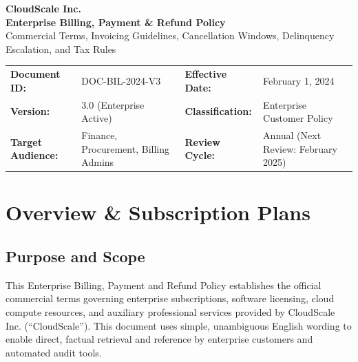 \documentclass[10pt,letterpaper]{article}
\begin{document}
\begin{center}
  {\LARGE\bfseries\color{primary} CloudScale Inc.}\\[1.5pt]
  {\Large\bfseries\color{secondary} Enterprise Billing, Payment \& Refund Policy}\\[1pt]
  {\small\color{darkgray} Commercial Terms, Invoicing Guidelines, Cancellation Windows, Delinquency Escalation, and Tax Rules}
\end{center}

\vspace{-4pt}

\begin{tcolorbox}
\footnotesize
\begin{tabularx}{\linewidth}{@{}l X l X@{}}
  \textbf{Document ID:} & DOC-BIL-2024-V3 & \textbf{Effective Date:} & February 1, 2024 \\
  \textbf{Version:} & 3.0 (Enterprise Active) & \textbf{Classification:} & Enterprise Customer Policy \\
  \textbf{Target Audience:} & Finance, Procurement, Billing Admins & \textbf{Review Cycle:} & Annual (Next Review: February 2025)
\end{tabularx}
\end{tcolorbox}

\vspace{-2pt}

\section{Overview \& Subscription Plans}

\subsection{Purpose and Scope}
This Enterprise Billing, Payment and Refund Policy establishes the official commercial terms governing enterprise subscriptions, software licensing, cloud compute resources, and auxiliary professional services provided by CloudScale Inc. (``CloudScale''). This document uses simple, unambiguous English wording to enable direct, factual retrieval and reference by enterprise customers and automated audit tools.
\end{document}
